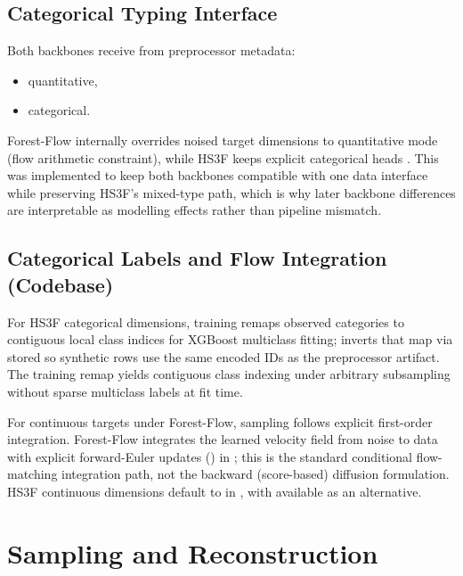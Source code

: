 \subsection{Categorical Typing Interface}

Both backbones receive  from preprocessor metadata:
\begin{itemize}\tightlist
    \item {} quantitative,
    \item {} categorical.
\end{itemize}

Forest-Flow internally overrides noised target dimensions to quantitative mode (flow arithmetic constraint), while HS3F keeps explicit categorical heads \cite{akazan2024hs3f}.
This was implemented to keep both backbones compatible with one data interface while preserving HS3F's mixed-type path, which is why later backbone differences are interpretable as modelling effects rather than pipeline mismatch.

\subsection{Categorical Labels and Flow Integration (Codebase)}

For HS3F categorical dimensions, training remaps observed categories to contiguous local class indices for XGBoost multiclass fitting;  inverts that map via stored  so synthetic rows use the same encoded IDs as the preprocessor artifact.
The training remap yields contiguous class indexing under arbitrary subsampling without sparse multiclass labels at fit time.

For continuous targets under Forest-Flow, sampling follows explicit first-order integration.
Forest-Flow integrates the learned velocity field from noise to data with explicit forward-Euler updates () in ; this is the standard conditional flow-matching integration path, not the backward (score-based) diffusion formulation.
HS3F continuous dimensions default to  in , with  available as an alternative.

\section{Sampling and Reconstruction}

